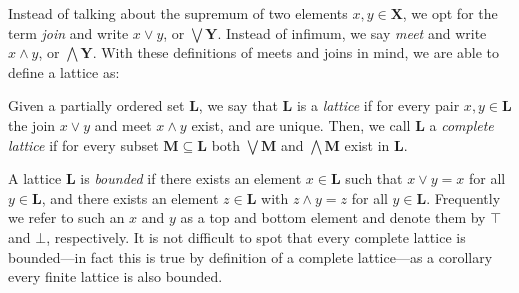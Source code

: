     Instead of talking about the supremum
of two elements $x,y \in \mathbf{X}$, we opt for the term \textit{join} and write $x \vee y$, or $\bigvee \mathbf{Y}$.
Instead of infimum, we say \textit{meet} and write $x \wedge y$, or $\textstyle \bigwedge \mathbf{Y}$. With these
definitions of meets and joins in mind, we are able to define a lattice as:

\begin{definition}
	\label{definition:lattice} Given a partially ordered set $\mathbf{L}$, we say that $\mathbf{L}$ is a \textit{lattice} if
	for every pair $x, y \in \mathbf{L}$ the join $x \vee y$ and meet $x \wedge y$ exist, and are unique. Then, we call
	$\mathbf{L}$ a \textit{complete lattice} if for every subset $\mathbf{M}\subseteq \mathbf{L}$ both $\bigvee \mathbf{M}$
	and $\bigwedge \mathbf{M}$ exist in $\mathbf{L}$.
\end{definition}


A lattice $\mathbf{L}$ is \textit{bounded} if there exists an element $x \in \mathbf{L}$ such that $x \vee y = x$ for
all $y \in \mathbf{L}$, and there exists an element $z \in \mathbf{L}$ with $z \wedge y = z$ for all $y \in \mathbf{L}$.
Frequently we refer to such an $x$ and $y$ as a top and bottom element and denote them by $\top$ and $\bot$, respectively.
It is not difficult to spot that every complete lattice is bounded---in fact this is true by definition of a complete
lattice---as a corollary every finite lattice is also bounded.


